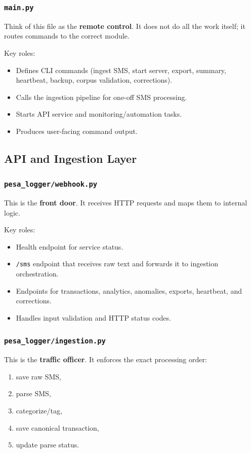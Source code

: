 \documentclass[12pt,a4paper]{article}
\begin{document}
\subsubsection*{\texttt{main.py}}
Think of this file as the \textbf{remote control}. It does not do all the work itself; it routes commands to the correct module.

Key roles:
\begin{itemize}[leftmargin=1.5em]
  \item Defines CLI commands (ingest SMS, start server, export, summary, heartbeat, backup, corpus validation, corrections).
  \item Calls the ingestion pipeline for one-off SMS processing.
  \item Starts API service and monitoring/automation tasks.
  \item Produces user-facing command output.
\end{itemize}

\subsection{API and Ingestion Layer}
\subsubsection*{\texttt{pesa\_logger/webhook.py}}
This is the \textbf{front door}. It receives HTTP requests and maps them to internal logic.

Key roles:
\begin{itemize}[leftmargin=1.5em]
  \item Health endpoint for service status.
  \item \texttt{/sms} endpoint that receives raw text and forwards it to ingestion orchestration.
  \item Endpoints for transactions, analytics, anomalies, exports, heartbeat, and corrections.
  \item Handles input validation and HTTP status codes.
\end{itemize}

\subsubsection*{\texttt{pesa\_logger/ingestion.py}}
This is the \textbf{traffic officer}. It enforces the exact processing order:
\begin{enumerate}[leftmargin=1.5em]
  \item save raw SMS,
  \item parse SMS,
  \item categorize/tag,
  \item save canonical transaction,
  \item update parse status.
\end{enumerate}
\end{document}
